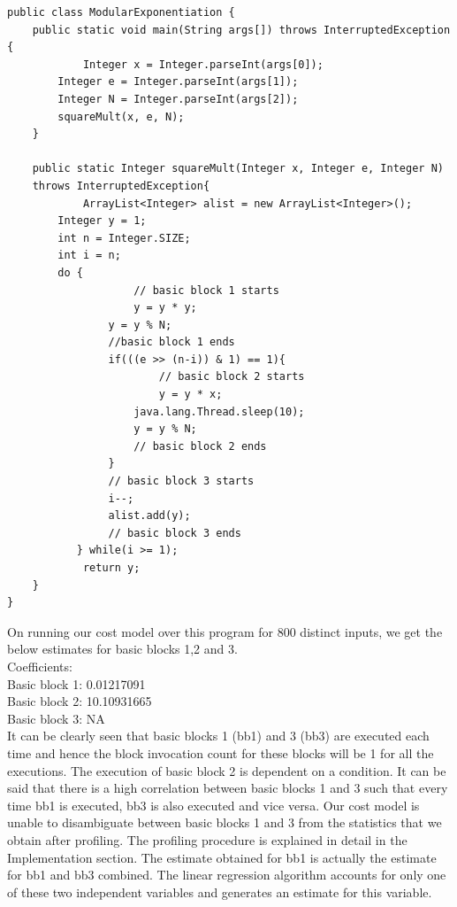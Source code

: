 \documentclass[11pt]{article}
\begin{document}
\singlespacing
\begin{lstlisting}
public class ModularExponentiation {
	public static void main(String args[]) throws InterruptedException {
    		Integer x = Integer.parseInt(args[0]);
        Integer e = Integer.parseInt(args[1]);
        Integer N = Integer.parseInt(args[2]);
		squareMult(x, e, N);
   	}

	public static Integer squareMult(Integer x, Integer e, Integer N) 
	throws InterruptedException{
    		ArrayList<Integer> alist = new ArrayList<Integer>();
        Integer y = 1;
        int n = Integer.SIZE;
        int i = n;
        do {
        			// basic block 1 starts
            		y = y * y;
                y = y % N;
                //basic block 1 ends
                if(((e >> (n-i)) & 1) == 1){
                		// basic block 2 starts
                		y = y * x;
                    java.lang.Thread.sleep(10);
                    y = y % N;
                    // basic block 2 ends
                }
                // basic block 3 starts
                i--;
                alist.add(y);
                // basic block 3 ends
           } while(i >= 1);
    		return y;
    }
}
\end{lstlisting}

On running our cost model over this program for 800 distinct inputs, we get the below estimates for basic blocks 1,2 and 3.\\

Coefficients:\\
Basic block 1: 0.01217091\\
Basic block 2: 10.10931665\\
Basic block 3: NA\\

It can be clearly seen that basic blocks 1 (bb1) and 3 (bb3) are executed each time and hence the block invocation count for these blocks will be 1 for all the executions. The execution of basic block 2 is dependent on a condition. It can be said that there is a high correlation between basic blocks 1 and 3 such that every time bb1 is executed, bb3 is also executed and vice versa. Our cost model is unable to disambiguate between basic blocks 1 and 3 from the statistics that we obtain after profiling. The profiling procedure is explained in detail in the Implementation section. The estimate obtained for bb1 is actually the estimate for bb1 and bb3 combined. The linear regression algorithm accounts for only one of these two independent variables and generates an estimate for this variable.\newline 
\end{document}
